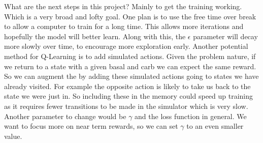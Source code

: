 \documentclass[11pt]{article}
\begin{document}
What are the next steps in this project? Mainly to get the training working. 
Which is a very broad and lofty goal.
One plan is to use the free time over break to allow a computer to train for a long time.
This allows more iterations and hopefully the model will better learn.
Along with this, the $\epsilon$ parameter will decay more slowly over time, to encourage more exploration early.
Another potential method for Q-Learning is to add simulated actions.
Given the problem nature, if we return to a state with a given basal and carb we can expect the same reward.
So we can augment the by adding these simulated actions going to states we have already visited.
For example the opposite action is likely to take us back to the state we were just in.
So including these in the memory could speed up training as it requires fewer transitions to be made in the simulator
which is very slow.
Another parameter to change would be $\gamma$ and the loss function in general.
We want to focus more on near term rewards, so we can set $\gamma$ to an even smaller value. 

\singlespacing


\end{document}
